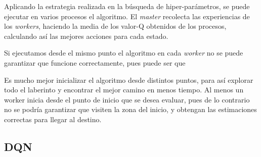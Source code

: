 		Aplicando la estrategia realizada en la búsqueda de hiper-parámetros, se puede ejecutar en varios procesos el algoritmo. El \textit{master} recolecta las experiencias de los \textit{workers}, haciendo la media de los valor-Q obtenidos de los procesos, calculando así las mejores acciones para cada estado. 
		
		Si ejecutamos desde el mismo punto el algoritmo en cada \textit{worker} no se puede garantizar que funcione correctamente, pues puede ser que 
		
		
		Es mucho mejor inicializar el algoritmo desde distintos puntos, para así explorar todo el laberinto y encontrar el mejor camino en menos tiempo. Al menos un worker inicia desde el punto de inicio que se desea evaluar, pues de lo contrario no se podría garantizar que visiten la zona del inicio, y obtengan las estimaciones correctas para llegar al destino.
			
			
	
	
	
	
	\subsection{DQN}
	
